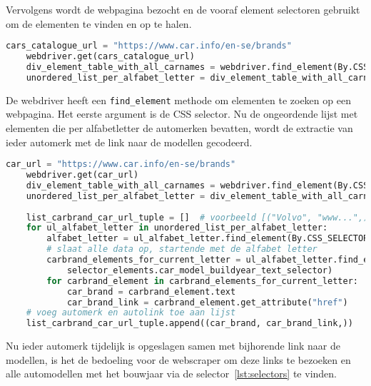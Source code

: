 Vervolgens wordt de webpagina bezocht en de vooraf element selectoren gebruikt om de elementen te vinden en op te halen.
\begin{lstlisting}[language=Python, caption=Selenium Webdriver haalt de webpagina op en vindt elementen, breaklines=true, showstringspaces=false]
	cars_catalogue_url = "https://www.car.info/en-se/brands"
	webdriver.get(cars_catalogue_url)
	div_element_table_with_all_carnames = webdriver.find_element(By.CSS_SELECTOR, selector_elements.car_brand_table_div_selector)
	unordered_list_per_alfabet_letter = div_element_table_with_all_carnames.find_elements(By.CSS_SELECTOR, selector_elements.car_brand_ul_alfabet_letter_selector)
\end{lstlisting}
De webdriver heeft een \texttt{find\_element} methode om elementen te zoeken op een webpagina. Het eerste argument is de CSS selector.
Nu de ongeordende lijst met elementen die per alfabetletter de automerken bevatten, wordt de extractie van ieder automerk met de link naar de modellen gecodeerd.
\begin{lstlisting}[language=Python, caption=Selenium Webdriver vindt per element het automerk en de link, breaklines=true, showstringspaces=false]
	car_url = "https://www.car.info/en-se/brands"
	webdriver.get(car_url)
	div_element_table_with_all_carnames = webdriver.find_element(By.CSS_SELECTOR, selector_elements.car_brand_table_div_selector)
	unordered_list_per_alfabet_letter = div_element_table_with_all_carnames.find_elements(By.CSS_SELECTOR, selector_elements.car_brand_ul_alfabet_letter_selector)
	
	list_carbrand_car_url_tuple = []  # voorbeeld [("Volvo", "www...",), ("Ferrari", "www...",)]
	for ul_alfabet_letter in unordered_list_per_alfabet_letter:
		alfabet_letter = ul_alfabet_letter.find_element(By.CSS_SELECTOR, "h2").text
		# slaat alle data op, startende met de alfabet letter
		carbrand_elements_for_current_letter = ul_alfabet_letter.find_elements(By.CLASS_NAME,
			selector_elements.car_model_buildyear_text_selector)
		for carbrand_element in carbrand_elements_for_current_letter:
			car_brand = carbrand_element.text
			car_brand_link = carbrand_element.get_attribute("href")
	# voeg automerk en autolink toe aan lijst
	list_carbrand_car_url_tuple.append((car_brand, car_brand_link,))
\end{lstlisting}
Nu ieder automerk tijdelijk is opgeslagen samen met bijhorende link naar de modellen, is het de bedoeling voor de webscraper om deze links te bezoeken en alle automodellen met het bouwjaar via de selector~\ref{lst:selectors} te vinden.
